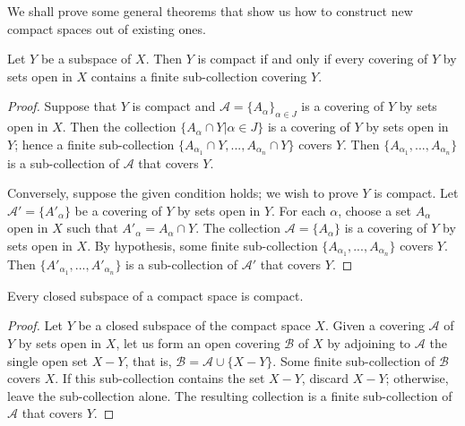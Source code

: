 \documentclass[a4paper,english,12pt]{article}
\begin{document}
We shall prove some general theorems that show us how to construct new
compact spaces out of existing ones.

\begin{lem}
	Let $Y$ be a subspace of $X$. Then $Y$ is compact if and only if every covering of $Y$ by sets open in $X$ contains a finite sub-collection covering $Y$.
\end{lem}
\begin{proof}
	Suppose that $Y$ is compact and $\mathcal{A} = \{A_\alpha\}_{\alpha \in J}$ is a covering of $Y$ by sets open in $X$. Then the collection
	$\{A_\alpha \cap Y | \alpha \in J \}$
	is a covering of $Y$ by sets open in $Y$; hence a finite sub-collection
	$ \{A_{\alpha_1} \cap Y, ... , A_{\alpha_n} \cap Y \}$ 
	covers $Y$. Then $\{A_{\alpha_1}, ...,A_{\alpha_n}\}$ is a sub-collection of $\mathcal{A}$ that covers $Y$. 
	
	Conversely, suppose the given condition holds; we wish to prove $Y$ is compact. Let $\mathcal{A}' = \{A'_\alpha \}$ be a covering of $Y$ by sets open in $Y$. For each $\alpha$, choose a set $A_\alpha$ open in $X$ such that $A'_\alpha = A_\alpha \cap Y$. The collection $\mathcal{A} = \{A_\alpha\}$ is a covering of $Y$ by sets open in $X$. By hypothesis, some finite sub-collection $\{A_{\alpha_1},..., A_{\alpha_n}\}$ covers $Y$. Then $\{A'_{\alpha_1},..., A'_{\alpha_n}\}$ is a sub-collection of $\mathcal{A}'$ that covers $Y$.
\end{proof}

\begin{thm}\label{thm26.2}
	Every closed subspace of a compact space is compact.
\end{thm}
\begin{proof}
	Let $Y$ be a closed subspace of the compact space $X$. Given a covering $\mathcal{A}$ of $Y$ by sets open in $X$, let us form an open covering $\mathcal{B}$ of $X$ by adjoining to $\mathcal{A}$ the single open set $X - Y$, that is, $\mathcal{B} = \mathcal{A} \cup \{X - Y\}$.
	Some finite sub-collection of $\mathcal{B}$ covers $X$. If this sub-collection contains the set $X - Y$, discard $X - Y$; otherwise, leave the sub-collection alone. The resulting collection is a finite sub-collection of $\mathcal{A}$ that covers $Y$.
\end{proof}
\end{document}
